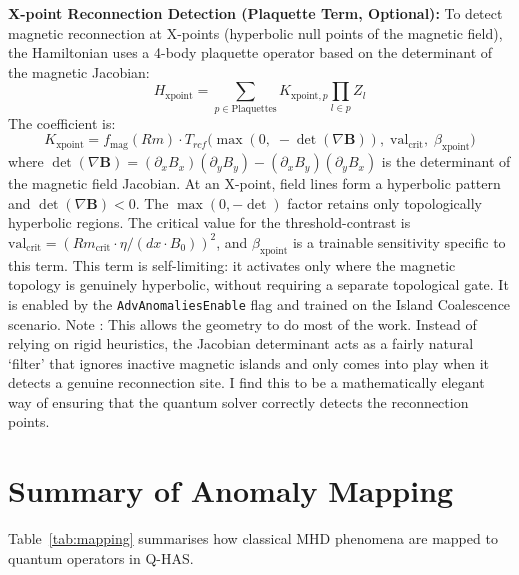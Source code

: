 \documentclass[12pt, a4paper, oneside]{report}
\begin{document}
\textbf{X-point Reconnection Detection (Plaquette Term, Optional):}
To detect magnetic reconnection at X-points (hyperbolic null points of the magnetic field), the Hamiltonian uses a 4-body plaquette operator based on the determinant of the magnetic Jacobian:
\begin{equation}
    H_{\text{xpoint}} = \sum_{p \in \text{Plaquettes}} K_{\text{xpoint},p} \prod_{l \in p} Z_l
\end{equation}
The coefficient is:
\begin{equation}
    K_{\text{xpoint}} = f_{\text{mag}}(Rm) \cdot T_{rcf}\!\bigl(\max(0,\; -\det(\nabla \mathbf{B})),\; \text{val}_{\text{crit}},\; \beta_{\text{xpoint}}\bigr)
\end{equation}
where $\det(\nabla \mathbf{B}) = (\partial_x B_x)(\partial_y B_y) - (\partial_x B_y)(\partial_y B_x)$ is the determinant of the magnetic field Jacobian. At an X-point, field lines form a hyperbolic pattern and $\det(\nabla \mathbf{B}) < 0$. The $\max(0, -\det)$ factor retains only topologically hyperbolic regions. The critical value for the threshold-contrast is $\text{val}_{\text{crit}} = (Rm_{\text{crit}} \cdot \eta / (dx \cdot B_0))^2$, and $\beta_{\text{xpoint}}$ is a trainable sensitivity specific to this term. This term is self-limiting: it activates only where the magnetic topology is genuinely hyperbolic, without requiring a separate topological gate. It is enabled by the \texttt{AdvAnomaliesEnable} flag and trained on the Island Coalescence scenario. Note : This allows the geometry to do most of the work. Instead of relying on rigid heuristics, the Jacobian determinant acts as a fairly natural ‘filter’ that ignores inactive magnetic islands and only comes into play when it detects a genuine reconnection site. I find this to be a mathematically elegant way of ensuring that the quantum solver correctly detects the reconnection points.


\section{Summary of Anomaly Mapping}
Table~\ref{tab:mapping} summarises how classical MHD phenomena are mapped to quantum operators in Q-HAS.
\end{document}
